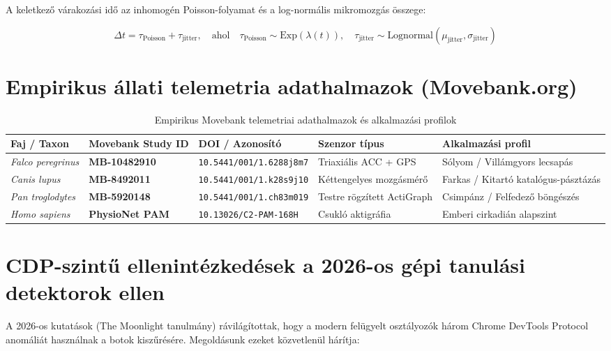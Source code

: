 \documentclass[11pt,a4paper]{article}
\begin{document}
\noindent A keletkező várakozási idő az inhomogén Poisson-folyamat és a log-normális mikromozgás összege:

\begin{equation}
\Delta t = \tau_{\text{Poisson}} + \tau_{\text{jitter}}, \quad \text{ahol} \quad \tau_{\text{Poisson}} \sim \text{Exp}(\lambda(t)), \quad \tau_{\text{jitter}} \sim \text{Lognormal}(\mu_{\text{jitter}}, \sigma_{\text{jitter}})
\end{equation}

\section{Empirikus állati telemetria adathalmazok (Movebank.org)}

\begin{table}[h!]
\centering
\small
\begin{tabular}{lllll}
\toprule
\textbf{Faj / Taxon} & \textbf{Movebank Study ID} & \textbf{DOI / Azonosító} & \textbf{Szenzor típus} & \textbf{Alkalmazási profil} \\ \midrule
\textit{Falco peregrinus} & \textbf{MB-10482910} & \texttt{10.5441/001/1.6288j8m7} & Triaxiális ACC + GPS & Sólyom / Villámgyors lecsapás \\
\textit{Canis lupus} & \textbf{MB-8492011} & \texttt{10.5441/001/1.k28s9j10} & Kéttengelyes mozgásmérő & Farkas / Kitartó katalógus-pásztázás \\
\textit{Pan troglodytes} & \textbf{MB-5920148} & \texttt{10.5441/001/1.ch83m019} & Testre rögzített ActiGraph & Csimpánz / Felfedező böngészés \\
\textit{Homo sapiens} & \textbf{PhysioNet PAM} & \texttt{10.13026/C2-PAM-168H} & Csukló aktigráfia & Emberi cirkadián alapszint \\ \bottomrule
\end{tabular}
\caption{Empirikus Movebank telemetriai adathalmazok és alkalmazási profilok}
\end{table}

\section{CDP-szintű ellenintézkedések a 2026-os gépi tanulási detektorok ellen}

A 2026-os kutatások (The Moonlight tanulmány) rávilágítottak, hogy a modern felügyelt osztályozók három Chrome DevTools Protocol anomáliát használnak a botok kiszűrésére. Megoldásunk ezeket közvetlenül hárítja:
\end{document}
